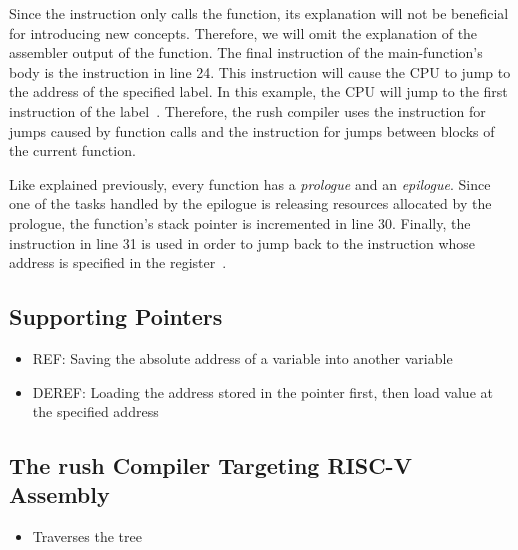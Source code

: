 Since the  instruction only calls the  function, its explanation will not be beneficial for introducing new concepts.
Therefore, we will omit the explanation of the assembler output of the  function.
The final instruction of the main-function's body is the  instruction in line 24.
This instruction will cause the CPU to jump to the address of the specified label.
In this example, the CPU will jump to the first instruction of the  label~\cite[p.~17]{Patterson2017}.
Therefore, the rush compiler uses the  instruction for jumps caused by function calls and the  instruction for jumps between blocks of the current function.

Like explained previously, every function has a \emph{prologue} and an \emph{epilogue}.
Since one of the tasks handled by the epilogue is releasing resources allocated by the prologue, the function's stack pointer is incremented in line 30.
Finally, the  instruction in line 31 is used in order to jump back to the instruction whose address is specified in the  register~\cite[reference]{Patterson2017}.

\subsection{Supporting Pointers}

\begin{itemize}
	\item REF: Saving the absolute address of a variable into another variable
	\item DEREF: Loading the address stored in the pointer first, then load value at the specified address
\end{itemize}

\subsection{The rush Compiler Targeting RISC-V Assembly}

\begin{itemize}
	\item Traverses the tree
\end{itemize}
